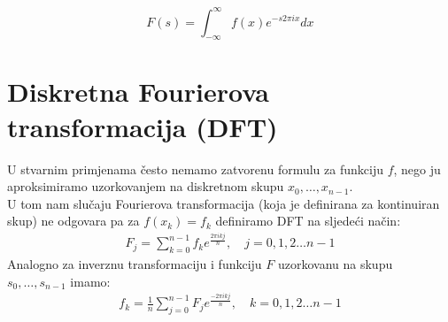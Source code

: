 \documentclass{article}
\begin{document}
\[
F(s)=\int_{-\infty}^{\infty}{f(x)e^{-s 2\pi ix}dx}
\]


\section{Diskretna Fourierova transformacija (DFT)}
U stvarnim primjenama često nemamo zatvorenu formulu za funkciju $f$, nego ju aproksimiramo uzorkovanjem na diskretnom skupu $x_{0},\ldots,x_{n-1}$.\\
U tom nam slučaju Fourierova transformacija (koja je definirana za kontinuiran skup) ne odgovara pa za $f(x_{k})=f_{k}$ definiramo DFT na sljedeći način:
\begin{align} \label{dft}
F_{j} = \sum_{k=0}^{n-1} f_{k} e^{\frac{2\pi ikj}{n}}, \quad j=0,1,2 \ldots n-1    
\end{align}
Analogno za inverznu transformaciju i funkciju $F$ uzorkovanu na skupu $s_{0},\ldots,s_{n-1}$ imamo:
\begin{align}
f_{k} =\frac{1}{n}\sum_{j=0}^{n-1}F_{j} e^{\frac{-2\pi ikj}{n}}, \quad k=0,1,2 \ldots n-1    
\end{align}
\end{document}
